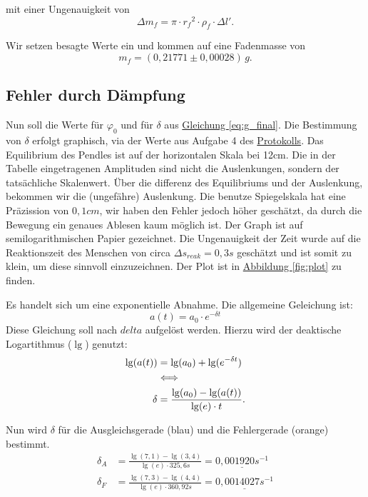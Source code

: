 mit einer Ungenauigkeit von
\begin{equation}
    \Delta m_f = \pi \cdot {r_f}^2 \cdot \rho_f \cdot \Delta l'.
\end{equation}

Wir setzen besagte Werte ein und kommen auf eine Fadenmasse von
\begin{equation}
    \boxed{
        m_f = (0,21771 \pm 0,00028) \, g.
    }
\end{equation}

\subsection{Fehler durch Dämpfung}
Nun soll die Werte für $\varphi_0$ und für $\delta$ aus \hyperref[eq:g_final]{Gleichung \ref*{eq:g_final}}. Die Bestimmung von $\delta$ erfolgt graphisch, via der Werte aus Aufgabe 4 des \hyperref[Protokoll]{Protokolls}. 
Das Equilibrium des Pendles ist auf der horizontalen Skala bei 12cm. Die in der Tabelle eingetragenen Amplituden sind nicht die Auslenkungen, sondern der tatsächliche Skalenwert. Über die differenz des Equilibriums und der Auslenkung, bekommen wir die (ungefähre) Auslenkung.
Die benutze Spiegelskala hat eine Präzission von $0,1cm$, wir haben den Fehler jedoch höher geschätzt, da durch die Bewegung ein genaues Ablesen kaum möglich ist. Der Graph ist auf semilogarithmischen Papier gezeichnet.
Die Ungenauigkeit der Zeit wurde auf die Reaktionszeit des Menschen von circa $\Delta s_{reak} = 0,3s$ geschätzt und ist somit zu klein, um diese sinnvoll einzuzeichnen. Der Plot ist in \hyperref[fig:plot]{Abbildung \ref*{fig:plot}} zu finden.

Es handelt sich um eine exponentielle Abnahme. Die allgemeine Geleichung ist:
\begin{equation}
    a(t) = a_0 \cdot e^{-\delta t}
\end{equation}
Diese Gleichung soll nach $delta$ aufgelöst werden. Hierzu wird der deaktische Logartithmus ($\lg$) genutzt:
\begin{align}
    \lg(a(t)) &= \lg(a_0) + \lg(e^{-\delta t}) \\ 
    \notag &\Longleftrightarrow \\
    \delta &= \frac{\lg(a_0) - \lg (a(t))}{\lg(e) \cdot t}.
\end{align}

Nun wird $\delta$ für die Ausgleichsgerade (blau) und die Fehlergerade (orange) bestimmt.
\begin{align}
    \delta_A &= \frac{\lg(7,1) - \lg(3,4)}{\lg(e) \cdot 325,6s} = \underline{0,001920 s^{-1}}\\
    \delta_F &= \frac{\lg(7,3) - \lg(4,4)}{\lg(e) \cdot 360,92s} = \underline{0,0014027 s^{-1}}
\end{align}

